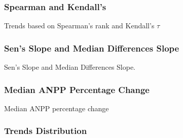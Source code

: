 \documentclass[serif, xcolor={dvipsnames}]{beamer} %
\begin{document}


\begin{frame}
\frametitle{Spearman and Kendall's}
Trends based on Spearman's rank and Kendall's $\tau$
\centering
\end{frame}
\begin{frame}
\frametitle{Sen's Slope and Median Differences Slope}
Sen's Slope and Median Differences Slope.
\begin{center}
\end{center}
\end{frame}
\begin{frame}
\frametitle{Median ANPP Percentage Change}
Median ANPP percentage change
\begin{center}
\end{center}
\end{frame}
\begin{frame}
\frametitle{Trends Distribution}
\begin{center}
\end{center}
\end{frame}

\end{document}

